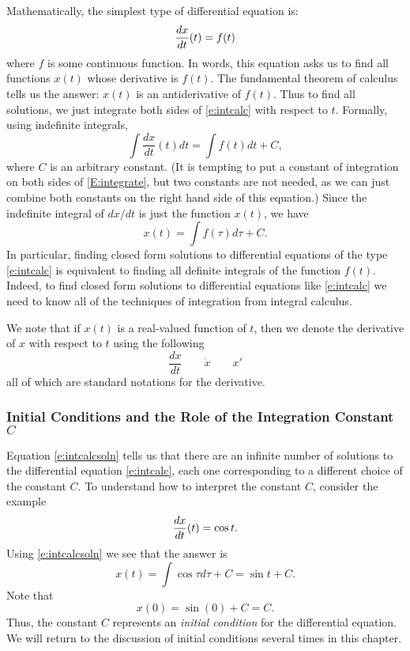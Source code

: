 \documentclass{ximera}
\begin{document}
Mathematically, the simplest type of differential equation is:
\begin{equation} \label{e:intcalc}
\displaystyle\frac{dx}{dt}(t) = f(t)
\end{equation}
where $f$ is some continuous function.  In words, this equation asks us
to find all functions $x(t)$ whose derivative is $f(t)$.  The fundamental
theorem of calculus tells us the answer: $x(t)$ is an antiderivative of
$f(t)$.  Thus to find all solutions, we just integrate both sides of
\eqref{e:intcalc} with respect to $t$.  Formally, using indefinite integrals, 
\begin{equation}  \label{E:integrate}
\int \frac{dx}{dt}(t)dt = \int f(t)dt + C,
\end{equation}
where $C$ is an arbitrary constant.  (It is tempting to put a constant of
integration on both sides of \eqref{E:integrate}, but two constants are not 
needed, as we can just combine both constants on the right hand side of
this equation.)   Since the indefinite integral of $dx/dt$ is just the
function $x(t)$, we have 
\begin{equation}  \label{e:intcalcsoln}
x(t) = \int f(\tau) d\tau + C.
\end{equation}
In particular, finding closed form solutions to differential equations
of the type \eqref{e:intcalc} is equivalent to finding all definite
integrals of the function $f(t)$.  Indeed, to find closed form solutions 
to differential equations like \eqref{e:intcalc} we need to know all of the 
techniques of integration from integral calculus.

We note that if $x(t)$ is a real-valued function of $t$, then we denote the 
derivative of $x$ with respect to $t$ using the following
\[
\frac{dx}{dt}\qquad \dot{x} \qquad x'
\]
all of which are standard notations for the derivative.


\subsubsection*{Initial Conditions and the Role of the Integration Constant 
$C$}

Equation \eqref{e:intcalcsoln} tells us that there are an infinite number of
solutions to the differential equation \eqref{e:intcalc}, each one
corresponding to a different choice of the constant $C$.  To understand how
to interpret the constant $C$, consider the example
\[
\displaystyle\frac{dx}{dt}(t) = \cos t.
\]
Using \eqref{e:intcalcsoln} we see that the answer is
\[
x(t) = \int \cos\tau d\tau  + C = \sin t + C.
\]
Note that 
\[
x(0) = \sin(0) + C = C.
\]
Thus, the constant $C$ represents an {\em initial condition\/} for the  
differential equation.  We will return to the discussion of initial 
conditions several times in this chapter.
\end{document}

